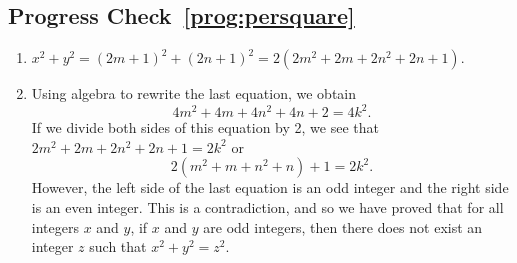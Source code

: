 \subsection*{Progress Check~\ref{prog:persquare}}
\begin{enumerate}
  \item $x^2 + y^2 = (2m + 1)^2 + (2n + 1)^2 = 2 \left( 2m^2 + 2m + 2n^2 + 2n + 1 \right)$.
  \item Using algebra to rewrite the last equation, we obtain
\[
4m^2 + 4m + 4n^2 + 4n + 2 = 4k^2.
\]
If we divide both sides of this equation by 2, we see that 
$2m^2 + 2m + 2n^2 + 2n + 1 = 2k^2$ or
\[
2 \left(m^2 + m + n^2 + n \right) + 1 = 2k^2.
\]
However, the left side of the last equation is an odd integer and the right side is an even integer.  This is a contradiction, and so we have proved that for all integers $x$ and $y$, if $x$ and $y$ are odd integers, then there does not exist an integer $z$ such that 
$x^2 + y^2 = z^2$.
\end{enumerate}
\hbreak



\endinput
